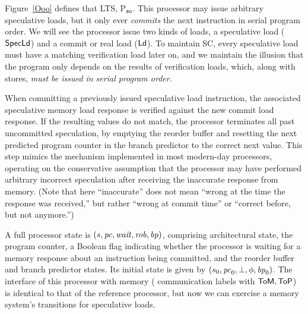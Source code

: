 Figure~\ref{Ooo} defines that LTS,
P$_{\texttt{so}}$. This processor may issue arbitrary speculative
loads, but it only ever \emph{commits} the next instruction in serial
program order. 
We will see the processor issue two kinds of loads, a speculative
load ($\mathsf{Spec}\mathsf{Ld}$) and a commit or real load ($\mathsf{Ld}$).  To maintain SC, every speculative
load must have a matching verification load later on, and we maintain
the illusion that the program only depends on the results of
verification loads, which, along with stores, \emph{must be issued in
serial program order}.

When committing a
previously issued speculative load instruction, the associated speculative
memory load response is verified against the new commit load response. If the
resulting values do not match, the processor terminates all past uncommitted
speculation, by emptying the reorder buffer and resetting the
next predicted program counter in the branch predictor to the correct next value. This step mimics
the mechanism implemented in most modern-day processors, operating on the
conservative assumption that the processor may have performed arbitrary
incorrect speculation after receiving the inaccurate response from
memory.  (Note that here ``inaccurate'' does not mean ``wrong at
the time the response was received,'' but rather ``wrong at commit
time'' or ``correct before, but not anymore.'')

A full processor state is $(s, \mathit{pc}, \mathit{wait}, \mathit{rob}, \mathit{bp})$, comprising
architectural state, the program counter, a Boolean flag indicating
whether the processor is waiting for a memory response about an
instruction being committed, and the reorder buffer and branch
predictor states. Its initial state is given by $(s_0, \mathit{pc}_0, \bot, \phi, \mathit{bp}_0)$.
The interface of this processor with memory (\ie{}
communication labels with $\mathsf{ToM}, \mathsf{ToP}$) is identical
to that of the reference processor, but now we can exercise a memory
system's transitions for speculative loads.


